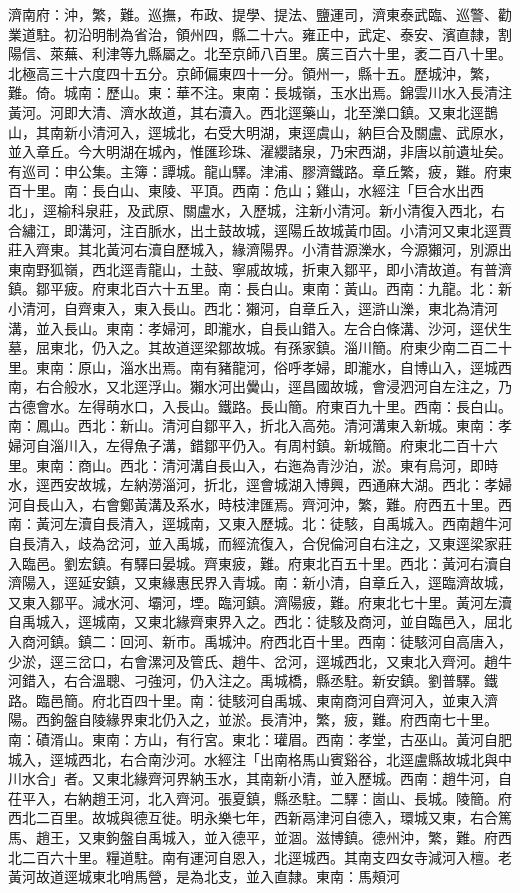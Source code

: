 \begin{pinyinscope}
濟南府：沖，繁，難。巡撫，布政、提學、提法、鹽運司，濟東泰武臨、巡警、勸業道駐。初沿明制為省治，領州四，縣二十六。雍正中，武定、泰安、濱直隸，割陽信、萊蕪、利津等九縣屬之。北至京師八百里。廣三百六十里，袤二百八十里。北極高三十六度四十五分。京師偏東四十一分。領州一，縣十五。歷城沖，繁，難。倚。城南：歷山。東：華不注。東南：長城嶺，玉水出焉。錦雲川水入長清注黃河。河即大清、濟水故道，其右瀆入。西北逕藥山，北至濼口鎮。又東北逕鵲山，其南新小清河入，逕城北，右受大明湖，東逕虞山，納巨合及關盧、武原水，並入章丘。今大明湖在城內，惟匯珍珠、濯纓諸泉，乃宋西湖，非唐以前遺址矣。有巡司：申公集。主簿：譚城。龍山驛。津浦、膠濟鐵路。章丘繁，疲，難。府東百十里。南：長白山、東陵、平頂。西南：危山；雞山，水經注「巨合水出西北」，逕榆科泉莊，及武原、關盧水，入歷城，注新小清河。新小清復入西北，右合繡江，即溝河，注百脈水，出土鼓故城，逕陽丘故城黃巾固。小清河又東北逕賈莊入齊東。其北黃河右瀆自歷城入，緣濟陽界。小清昔源濼水，今源獺河，別源出東南野狐嶺，西北逕青龍山，土鼓、寧戚故城，折東入鄒平，即小清故道。有普濟鎮。鄒平疲。府東北百六十五里。南：長白山。東南：黃山。西南：九龍。北：新小清河，自齊東入，東入長山。西北：獺河，自章丘入，逕滸山濼，東北為清河溝，並入長山。東南：孝婦河，即瀧水，自長山錯入。左合白條溝、沙河，逕伏生墓，屈東北，仍入之。其故道逕梁鄒故城。有孫家鎮。淄川簡。府東少南二百二十里。東南：原山，淄水出焉。南有豬龍河，俗呼孝婦，即瀧水，自博山入，逕城西南，右合般水，又北逕浮山。獺水河出黌山，逕昌國故城，會浸泗河自左注之，乃古德會水。左得萌水口，入長山。鐵路。長山簡。府東百九十里。西南：長白山。南：鳳山。西北：新山。清河自鄒平入，折北入高苑。清河溝東入新城。東南：孝婦河自淄川入，左得魚子溝，錯鄒平仍入。有周村鎮。新城簡。府東北二百十六里。東南：商山。西北：清河溝自長山入，右迤為青沙泊，淤。東有烏河，即時水，逕西安故城，左納澇淄河，折北，逕會城湖入博興，西通麻大湖。西北：孝婦河自長山入，右會鄭黃溝及系水，時枝津匯焉。齊河沖，繁，難。府西五十里。西南：黃河左瀆自長清入，逕城南，又東入歷城。北：徒駭，自禹城入。西南趙牛河自長清入，歧為岔河，並入禹城，而經流復入，合倪倫河自右注之，又東逕梁家莊入臨邑。劉宏鎮。有驛曰晏城。齊東疲，難。府東北百五十里。西北：黃河右瀆自濟陽入，逕延安鎮，又東緣惠民界入青城。南：新小清，自章丘入，逕臨濟故城，又東入鄒平。減水河、壩河，堙。臨河鎮。濟陽疲，難。府東北七十里。黃河左瀆自禹城入，逕城南，又東北緣齊東界入之。西北：徒駭及商河，並自臨邑入，屈北入商河鎮。鎮二：回河、新市。禹城沖。府西北百十里。西南：徒駭河自高唐入，少淤，逕三岔口，右會漯河及管氏、趙牛、岔河，逕城西北，又東北入齊河。趙牛河錯入，右合溫聰、刁強河，仍入注之。禹城橋，縣丞駐。新安鎮。劉普驛。鐵路。臨邑簡。府北百四十里。南：徒駭河自禹城、東南商河自齊河入，並東入濟陽。西鉤盤自陵緣界東北仍入之，並淤。長清沖，繁，疲，難。府西南七十里。南：磧湑山。東南：方山，有行宮。東北：瓘眉。西南：孝堂，古巫山。黃河自肥城入，逕城西北，右合南沙河。水經注「出南格馬山賓谿谷，北逕盧縣故城北與中川水合」者。又東北緣齊河界納玉水，其南新小清，並入歷城。西南：趙牛河，自茌平入，右納趙王河，北入齊河。張夏鎮，縣丞駐。二驛：崮山、長城。陵簡。府西北二百里。故城與德互徙。明永樂七年，西新鬲津河自德入，環城又東，右合篤馬、趙王，又東鉤盤自禹城入，並入德平，並涸。滋博鎮。德州沖，繁，難。府西北二百六十里。糧道駐。南有運河自恩入，北逕城西。其南支四女寺減河入檀。老黃河故道逕城東北哨馬營，是為北支，並入直隸。東南：馬頰河
\end{pinyinscope}
